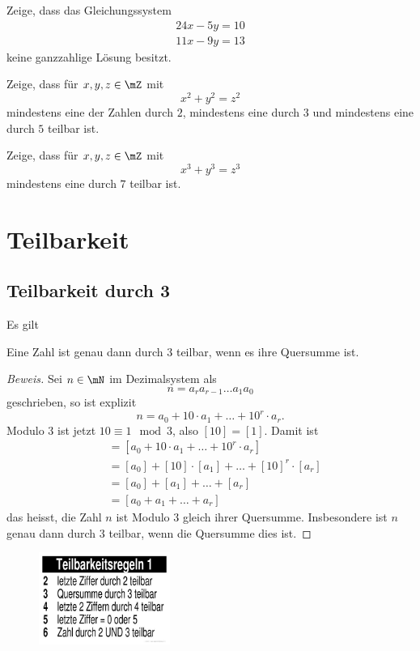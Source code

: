 \documentclass[%
11pt,%
twoside,%
titlepage,%
german,%
headsepline%
]{scrartcl}
\begin{document}
\begin{ueb}
Zeige, dass das Gleichungssystem
\begin{align}
24x-5y=10\\
11x-9y=13
\end{align}
keine ganzzahlige Lösung besitzt.
\end{ueb}

\begin{ueb}[Pythagoras]
Zeige, dass für $x,y,z\in\mZ$ mit
$$x^2+y^2=z^2$$
mindestens eine der Zahlen durch $2$, mindestens eine durch $3$ und mindestens eine durch $5$ teilbar ist.
\end{ueb}

\begin{ueb}[Kubisch]
Zeige, dass für $x,y,z\in\mZ$ mit
$$x^3+y^3=z^3$$
mindestens eine durch $7$ teilbar ist.
\end{ueb}

\clearpage

\section{Teilbarkeit}
\subsection{Teilbarkeit durch 3}

Es gilt
\begin{csatz}{}
Eine
Zahl ist genau dann durch $3$ teilbar, wenn es ihre Quersumme ist.
\end{csatz}
\begin{proof}[Beweis]
Sei $n\in\mN$ im Dezimalsystem als
$$n=a_ra_{r-1}\dots a_1a_0$$
geschrieben, so ist explizit
$$n=a_0+10\cdot a_1+\dots+10^r\cdot a_r.$$
Modulo $3$ ist jetzt $10\equiv1\mod3$, also $[10]=[1]$. Damit ist
\begin{align*}
[n]&=[a_0+10\cdot a_1+\dots+10^r\cdot a_r]\\
&=[a_0]+[10]\cdot[a_1]+\dots+[10]^r\cdot[a_r]\\
&=[a_0]+[a_1]+\dots+[a_r]\\
&=[a_0+a_1+\dots+a_r]
\end{align*}
das heisst, die Zahl $n$ ist Modulo $3$ gleich ihrer Quersumme. Insbesondere ist $n$ genau dann durch $3$ teilbar, wenn die Quersumme dies ist.
\end{proof}

\begin{figure}
\begin{center}
    \includegraphics[width=0.382\textwidth]{pictures/regeln}
  \end{center}
\end{figure}
\end{document}

